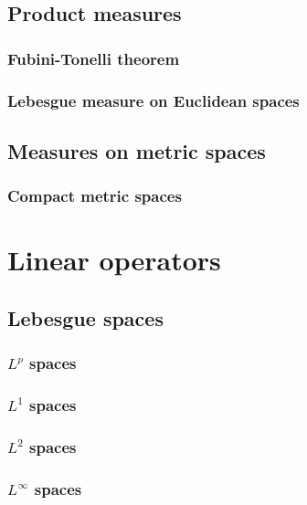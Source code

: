 \documentclass{../note}
\begin{document}
\chapter{Product measures}
\section{Fubini-Tonelli theorem}
\section{Lebesgue measure on Euclidean spaces}


\chapter{Measures on metric spaces}


\section{Compact metric spaces}









\part{Linear operators}



\chapter{Lebesgue spaces}
\section{$L^p$ spaces}
\section{$L^1$ spaces}
\section{$L^2$ spaces}
\section{$L^\infty$ spaces}
\end{document}
